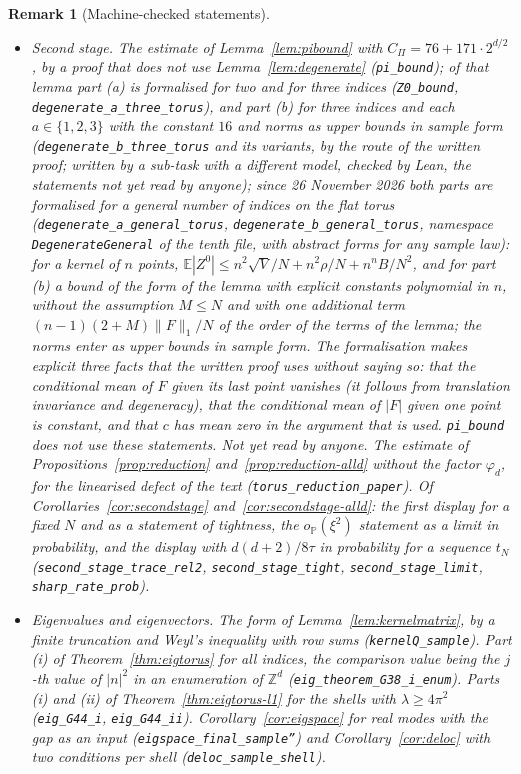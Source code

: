 \documentclass[11pt,a4paper]{article}
\theoremstyle{stmt}
\theoremstyle{defn}
\theoremstyle{rmk}
\newtheorem{remark}[theorem]{Remark}
\numberwithin{equation}{section}
\begin{document}
{\begin{remark}[Machine-checked statements]
\begin{itemize}
\item \emph{Second stage.} The estimate of Lemma~\ref{lem:pibound} with $C_\Pi=76+171\cdot2^{d/2}$, by a proof that does not use Lemma~\ref{lem:degenerate} (\texttt{pi\_bound}); of that lemma part (a) is formalised for two and for three indices (\texttt{Z0\_bound}, \texttt{degenerate\_a\_three\_torus}), and part (b) for three indices and each $a\in\{1,2,3\}$ with the constant $16$ and norms as upper bounds in sample form (\texttt{degenerate\_b\_three\_torus} and its variants, by the route of the written proof; written by a sub-task with a different model, checked by Lean, the statements not yet read by anyone); since 26 November 2026 both parts are formalised for a general number of indices on the flat torus (\texttt{degenerate\_a\_general\_torus}, \texttt{degenerate\_b\_general\_torus}, namespace \texttt{DegenerateGeneral} of the tenth file, with abstract forms for any sample law): for a kernel of $n$ points, $\mathbb E|Z^0|\le n^2\sqrt V/N+n^2\rho/N+n^nB/N^2$, and for part (b) a bound of the form of the lemma with explicit constants polynomial in $n$, without the assumption $M\le N$ and with one additional term $(n-1)(2+M)\|F\|_1/N$ of the order of the terms of the lemma; the norms enter as upper bounds in sample form. The formalisation makes explicit three facts that the written proof uses without saying so: that the conditional mean of $F$ given its last point vanishes (it follows from translation invariance and degeneracy), that the conditional mean of $|F|$ given one point is constant, and that $c$ has mean zero in the argument that is used. \texttt{pi\_bound} does not use these statements. Not yet read by anyone. The estimate of Propositions~\ref{prop:reduction} and~\ref{prop:reduction-alld} without the factor $\varphi_d$, for the linearised defect of the text (\texttt{torus\_reduction\_paper}). Of Corollaries~\ref{cor:secondstage} and~\ref{cor:secondstage-alld}: the first display for a fixed $N$ and as a statement of tightness, the $o_{\mathbb P}(\xi^2)$ statement as a limit in probability, and the display with $d(d+2)/8\tau$ in probability for a sequence $t_N$ (\texttt{second\_stage\_trace\_rel2}, \texttt{second\_stage\_tight}, \texttt{second\_stage\_limit}, \texttt{sharp\_rate\_prob}).
\item \emph{Eigenvalues and eigenvectors.} The form of Lemma~\ref{lem:kernelmatrix}, by a finite truncation and Weyl's inequality with row sums (\texttt{kernelQ\_sample}). Part (i) of Theorem~\ref{thm:eigtorus} for all indices, the comparison value being the $j$-th value of $|n|^2$ in an enumeration of $\mathbb Z^d$ (\texttt{eig\_theorem\_G38\_i\_enum}). Parts (i) and (ii) of Theorem~\ref{thm:eigtorus-l1} for the shells with $\lambda\ge4\pi^2$ (\texttt{eig\_G44\_i}, \texttt{eig\_G44\_ii}). Corollary~\ref{cor:eigspace} for real modes with the gap as an input (\texttt{eigspace\_final\_sample''}) and Corollary~\ref{cor:deloc} with two conditions per shell (\texttt{deloc\_sample\_shell}).

\end{itemize}
\end{remark}}
\end{document}
